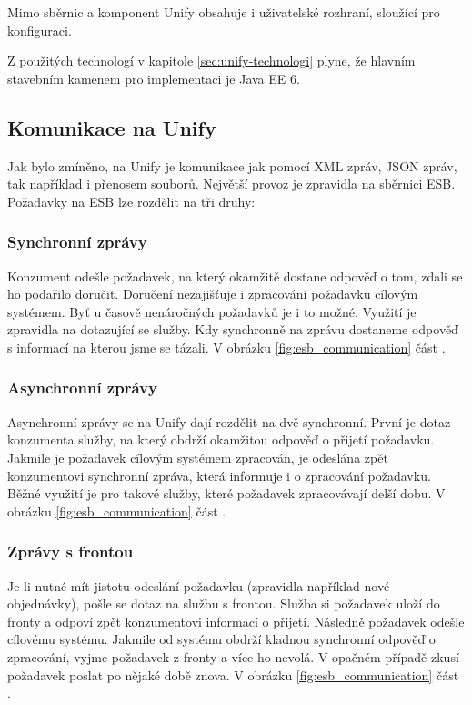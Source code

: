 \documentclass[thesis=M,czech]{FITthesis}[2012/10/20]
\begin{document}
			Mimo sběrnic a komponent Unify obsahuje i uživatelské rozhraní, sloužící pro konfiguraci. 
			
			Z použitých technologí v kapitole \ref{sec:unify-technologi} plyne, že hlavním stavebním kamenem pro implementaci je Java EE 6.
		
		\subsection{Komunikace na Unify}
			Jak bylo zmíněno, na Unify je komunikace jak pomocí XML zpráv, JSON zpráv, tak například i přenosem souborů. Největší provoz je zpravidla na sběrnici ESB. Požadavky na ESB lze rozdělit na tři druhy:
			
			\subsubsection{Synchronní zprávy}
				Konzument odešle požadavek, na který okamžitě dostane odpověď o tom, zdali se ho podařilo doručit. Doručení nezajišťuje i zpracování požadavku cílovým systémem. Byť u časově nenáročných požadavků je i to možné. Využití je zpravidla na dotazující se služby. Kdy synchronně na zprávu dostaneme odpověď s informací na kterou jsme se tázali. V obrázku \ref{fig:esb_communication} část .
			
			\subsubsection{Asynchronní zprávy}
				Asynchronní zprávy se na Unify dají rozdělit na dvě synchronní. První je dotaz konzumenta služby, na který obdrží okamžitou odpověď o přijetí požadavku. Jakmile je požadavek cílovým systémem zpracován, je odeslána zpět konzumentovi synchronní zpráva, která informuje i o zpracování požadavku. Běžné využití je pro takové služby, které požadavek zpracovávají delší dobu. V obrázku \ref{fig:esb_communication} část .
			
			\subsubsection{Zprávy s frontou}
				Je-li nutné mít jistotu odeslání požadavku (zpravidla například nové objednávky), pošle se dotaz na službu s frontou. Služba si požadavek uloží do fronty a odpoví zpět konzumentovi informací o přijetí. Následně požadavek odešle cílovému systému. Jakmile od systému obdrží kladnou synchronní odpověď o zpracování, vyjme požadavek z fronty a více ho nevolá. V opačném případě zkusí požadavek poslat po nějaké době znova. V obrázku \ref{fig:esb_communication} část .
				
\end{document}

